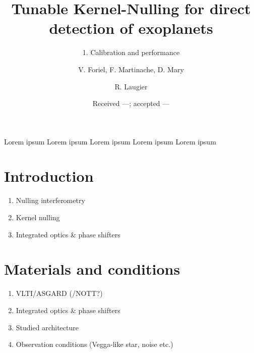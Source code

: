\documentclass{aa}
\begin{document}
 

   \title{Tunable Kernel-Nulling for direct detection of exoplanets}

   \subtitle{1. Calibration and performance}

   \author{V. Foriel,
            F. Martinache,
            D. Mary
            \and
            R. Laugier
          }


   \date{Received ---; accepted ---}

 
  \abstract
   {Lorem ipsum}
   {Lorem ipsum}
   {Lorem ipsum}
   {Lorem ipsum}
   {Lorem ipsum}


   \maketitle
%

\section{Introduction}

    \begin{enumerate}
        \item Nulling interferometry
        \item Kernel nulling
        \item Integrated optics \& phase shifters
    \end{enumerate}


\section{Materials and conditions}

    \begin{enumerate}
        \item VLTI/ASGARD (/NOTT?)
        \item Integrated optics \& phase shifters
        \item Studied architecture
        \item Observation conditions (Vegga-like star, noise etc.)
    \end{enumerate}
\end{document}
